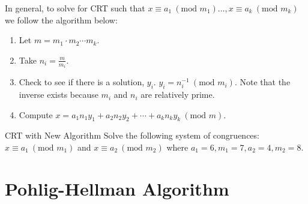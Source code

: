 \begin{note}
    In general, to solve for CRT such that \(x \equiv a_1 \ (\text{mod } m_1)\dots, x \equiv a_k \ (\text{mod } m_k)\) we follow the algorithm below:
    \begin{enumerate}
        \item Let \(m = m_1 \cdot m_2 \cdots m_k\).
        \item Take \(n_i = \frac{m}{m_i}\).
        \item  Check to see if there is a solution, \(y_i\). \(y_i = n_i^{-1} \ (\text{mod } m_i)\). Note that the inverse exists because \(m_i\) and \(n_i\) are relatively prime.
        \item Compute \(x = a_1n_1y_1 + a_2n_2y_2 + \cdots + a_kn_ky_k \ (\text{mod } m)\).
    \end{enumerate}
\end{note}

\begin{example}
    {CRT with New Algorithm}
    Solve the following system of congruences: \(x \equiv a_1 \ (\text{mod } m_1)\) and \(x \equiv a_2 \ (\text{mod } m_2)\) where \(a_1 = 6, m_1 = 7, a_2 = 4, m_2 = 8\).
\end{example}

\hypertarget{Pohlig-Hellman}{}
\section{Pohlig-Hellman Algorithm}

